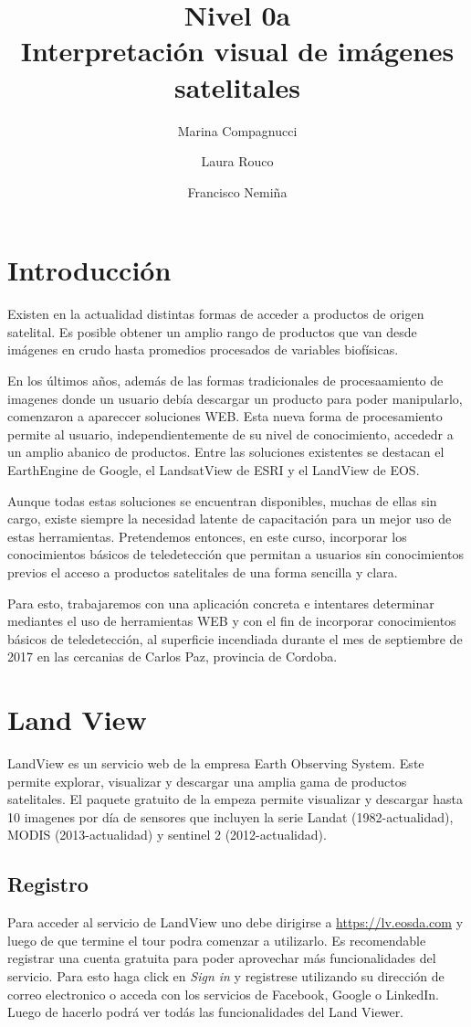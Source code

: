 \documentclass[a4paper,12pt]{book}
\title{{\large Nivel 0a} \\ Interpretación visual de imágenes satelitales}
\author{Marina Compagnucci \and Laura Rouco \and Francisco Nemiña}
\begin{document}
\maketitle
\titlepage

\chapter{Introducción}
Existen en la actualidad distintas formas de acceder a productos de origen satelital. Es posible obtener un amplio rango de productos que van desde imágenes en crudo hasta promedios procesados de variables biofísicas.

En los últimos años, además de las formas tradicionales de procesaamiento de imagenes donde un usuario debía descargar un producto para poder manipularlo, comenzaron a apareccer soluciones WEB. Esta nueva forma de procesamiento permite al usuario, independientemente de su nivel de conocimiento, accededr a un amplio abanico de productos. Entre las soluciones existentes se destacan el EarthEngine de Google, el LandsatView de ESRI y el LandView de EOS.

Aunque todas estas soluciones se encuentran disponibles, muchas de ellas sin cargo, existe siempre la necesidad latente de capacitación para un mejor uso de estas herramientas. Pretendemos entonces, en este curso, incorporar los conocimientos básicos de teledetección que permitan a usuarios sin conocimientos previos el acceso a productos satelitales de una forma sencilla y clara.

Para esto, trabajaremos con una aplicación concreta e intentares determinar mediantes el uso de herramientas WEB y con el fin de incorporar conocimientos básicos de teledetección, al superficie incendiada durante el mes de septiembre de 2017 en las cercanias de Carlos Paz, provincia de Cordoba.

\chapter{Land View}

LandView es un servicio web de la empresa Earth Observing System. Este permite explorar, visualizar y descargar una amplia gama de productos satelitales. El paquete gratuito de la empeza permite visualizar y descargar hasta 10 imagenes por día de sensores que incluyen la serie Landat (1982-actualidad), MODIS (2013-actualidad) y sentinel 2 (2012-actualidad).

\section{Registro}
Para acceder al servicio de LandView uno debe dirigirse a \url{https://lv.eosda.com} y luego de que termine el tour podra comenzar a utilizarlo. Es recomendable registrar una cuenta gratuita para poder aprovechar más funcionalidades del servicio. Para esto haga click en \emph{Sign in} y registrese utilizando su dirección de correo electronico o acceda con los servicios de Facebook, Google o LinkedIn. Luego de hacerlo podrá ver todás las funcionalidades del Land Viewer.
\end{document}
